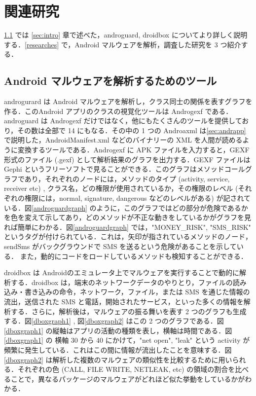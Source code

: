 \section{関連研究}
\ref{tools} では \ref{sec:intro} 章で述べた，androguard, droidbox についてより詳しく説明する．\ref{researches} で，Android マルウェアを解析，調査した研究を 3 つ紹介する．
\subsection{Android マルウェアを解析するためのツール}
\label{tools}
androgurard \cite{aguard} は Android マルウェアを解析し，クラス同士の関係を表すグラフを作る．このAndroid アプリのクラスの視覚化ツールは Androgexf である．androguard  は Androgexf だけではなく，他にもたくさんのツールを提供しており，その数は全部で 14 にもなる．その中の 1 つの Androaxml は\ref{sec:andrapp} で説明した，AndroidManifest.xml などのバイナリーの XML を人間が読めるように変換するツールである．Androgexf  に APK ファイルを入力すると，GEXF 形式のファイル (.gexf) として解析結果のグラフを出力する．GEXF ファイルは Gephi というフリーソフトで見ることができる．このグラフはメソッドコールグラフであり，それぞれのノードには，メソッドのタイプ (activity, service, receiver etc) , クラス名，どの権限が使用されているか，その権限のレベル (それぞれの権限には，normal, signature, dangerous などのレベルがある) が記されている．図\ref{androguardgraph} のように，このグラフではどの部分が危険であるかを色を変えて示してあり，どのメソッドが不正な動きをしているかがグラフを見れば簡単にわかる．図\ref{androguardgraph} では，"MONEY\_RISK", "SMS\_RISK" というタグが付けられている．これは，矢印が指されているメソッドのノード，sendSms がバックグラウンドで SMS を送るという危険があることを示している． また，動的にコードをロードしているメソッドも検知することができる．

droidbox \cite{dbox} は Androidのエミュレータ上でマルウェアを実行することで動的に解析する．droidbox  は，端末のネットワークデータのやりとり，ファイルの読み込み・書き込みの命令，ネットワーク，ファイル，または SMS を通じた情報の流出，送信された SMS と電話，開始されたサービス，といった多くの情報を解析する．さらに，解析後は，マルウェアの振る舞いを表す 2 つのグラフも生成する．図\ref{dboxgraph1} , 図\ref{dboxgraph2} はこの 2 つのグラフである．図\ref{dboxgraph1} の縦軸はアプリの活動の種類を表し，横軸は時間である．図\ref{dboxgraph1} の 横軸  30 から 40 にかけて，"net open", "leak" という activity が頻繁に発生している．これはこの間に情報が流出したことを意味する．図\ref{dboxgraph2} は解析した複数のマルウェアの類似性を比較するために用いられる．それぞれの色 (CALL, FILE WRITE, NETLEAK, etc) の領域の割合を比べることで，異なるパッケージのマルウェアがどれほど似た挙動をしているかがわかる．

